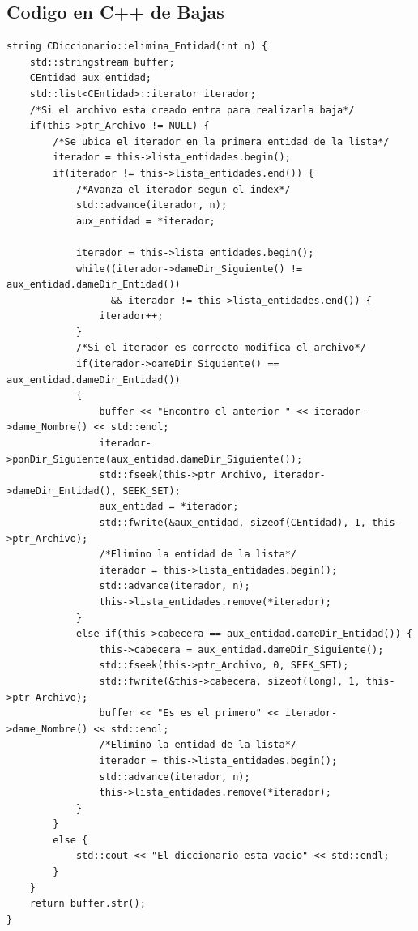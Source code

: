 \subsection{Codigo en C++ de Bajas}
\begin{lstlisting}[frame=single]
string CDiccionario::elimina_Entidad(int n) {
    std::stringstream buffer;
    CEntidad aux_entidad;
    std::list<CEntidad>::iterator iterador;
	/*Si el archivo esta creado entra para realizarla baja*/
    if(this->ptr_Archivo != NULL) {
    	/*Se ubica el iterador en la primera entidad de la lista*/
        iterador = this->lista_entidades.begin();
        if(iterador != this->lista_entidades.end()) {
        	/*Avanza el iterador segun el index*/
            std::advance(iterador, n);
            aux_entidad = *iterador;

            iterador = this->lista_entidades.begin();
            while((iterador->dameDir_Siguiente() != aux_entidad.dameDir_Entidad())
                  && iterador != this->lista_entidades.end()) {
                iterador++;
            }
            /*Si el iterador es correcto modifica el archivo*/
            if(iterador->dameDir_Siguiente() == aux_entidad.dameDir_Entidad())
            {
                buffer << "Encontro el anterior " << iterador->dame_Nombre() << std::endl;
                iterador->ponDir_Siguiente(aux_entidad.dameDir_Siguiente());
                std::fseek(this->ptr_Archivo, iterador->dameDir_Entidad(), SEEK_SET);
                aux_entidad = *iterador;
                std::fwrite(&aux_entidad, sizeof(CEntidad), 1, this->ptr_Archivo);
                /*Elimino la entidad de la lista*/
                iterador = this->lista_entidades.begin();
                std::advance(iterador, n);
                this->lista_entidades.remove(*iterador);
            }
            else if(this->cabecera == aux_entidad.dameDir_Entidad()) {
                this->cabecera = aux_entidad.dameDir_Siguiente();
                std::fseek(this->ptr_Archivo, 0, SEEK_SET);
                std::fwrite(&this->cabecera, sizeof(long), 1, this->ptr_Archivo);
                buffer << "Es es el primero" << iterador->dame_Nombre() << std::endl;
                /*Elimino la entidad de la lista*/
                iterador = this->lista_entidades.begin();
                std::advance(iterador, n);
                this->lista_entidades.remove(*iterador);
            }
        }
        else {
            std::cout << "El diccionario esta vacio" << std::endl;
        }
    }
    return buffer.str();
}
\end{lstlisting}

